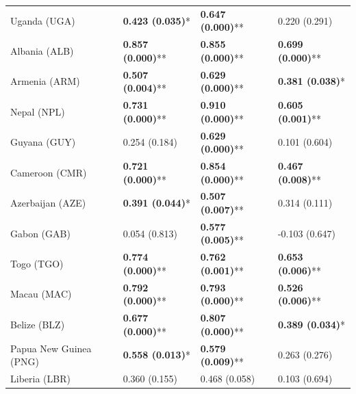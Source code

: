 \begin{longtable}{p{5cm}p{3cm}p{3cm}p{5cm}}
Uganda (UGA) & \textcolor{atlLime600}{\textbf{0.423 (0.035)}*} & \textcolor{atlLime600}{\textbf{0.647 (0.000)}**} & \textcolor{atlOrange600}{0.220 (0.291)} \\
Albania (ALB) & \textcolor{atlLime600}{\textbf{0.857 (0.000)}**} & \textcolor{atlLime600}{\textbf{0.855 (0.000)}**} & \textcolor{atlLime600}{\textbf{0.699 (0.000)}**} \\
Armenia (ARM) & \textcolor{atlLime600}{\textbf{0.507 (0.004)}**} & \textcolor{atlLime600}{\textbf{0.629 (0.000)}**} & \textcolor{atlLime600}{\textbf{0.381 (0.038)}*} \\
Nepal (NPL) & \textcolor{atlLime600}{\textbf{0.731 (0.000)}**} & \textcolor{atlLime600}{\textbf{0.910 (0.000)}**} & \textcolor{atlLime600}{\textbf{0.605 (0.001)}**} \\
Guyana (GUY) & \textcolor{atlOrange600}{0.254 (0.184)} & \textcolor{atlLime600}{\textbf{0.629 (0.000)}**} & \textcolor{atlOrange600}{0.101 (0.604)} \\
Cameroon (CMR) & \textcolor{atlLime600}{\textbf{0.721 (0.000)}**} & \textcolor{atlLime600}{\textbf{0.854 (0.000)}**} & \textcolor{atlLime600}{\textbf{0.467 (0.008)}**} \\
Azerbaijan (AZE) & \textcolor{atlLime600}{\textbf{0.391 (0.044)}*} & \textcolor{atlLime600}{\textbf{0.507 (0.007)}**} & \textcolor{atlOrange600}{0.314 (0.111)} \\
Gabon (GAB) & \textcolor{atlOrange600}{0.054 (0.813)} & \textcolor{atlLime600}{\textbf{0.577 (0.005)}**} & \textcolor{atlOrange600}{-0.103 (0.647)} \\
Togo (TGO) & \textcolor{atlLime600}{\textbf{0.774 (0.000)}**} & \textcolor{atlLime600}{\textbf{0.762 (0.001)}**} & \textcolor{atlLime600}{\textbf{0.653 (0.006)}**} \\
Macau (MAC) & \textcolor{atlLime600}{\textbf{0.792 (0.000)}**} & \textcolor{atlLime600}{\textbf{0.793 (0.000)}**} & \textcolor{atlLime600}{\textbf{0.526 (0.006)}**} \\
Belize (BLZ) & \textcolor{atlLime600}{\textbf{0.677 (0.000)}**} & \textcolor{atlLime600}{\textbf{0.807 (0.000)}**} & \textcolor{atlLime600}{\textbf{0.389 (0.034)}*} \\
Papua New Guinea (PNG) & \textcolor{atlLime600}{\textbf{0.558 (0.013)}*} & \textcolor{atlLime600}{\textbf{0.579 (0.009)}**} & \textcolor{atlOrange600}{0.263 (0.276)} \\
Liberia (LBR) & \textcolor{atlOrange600}{0.360 (0.155)} & \textcolor{atlOrange600}{0.468 (0.058)} & \textcolor{atlOrange600}{0.103 (0.694)} \\

\end{longtable}
